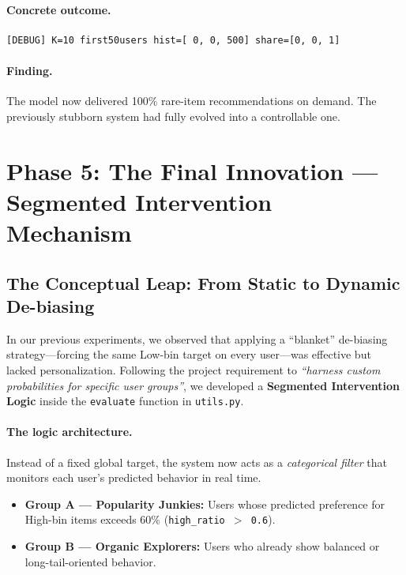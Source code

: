 \documentclass[11pt,a4paper]{article}
\begin{document}
\paragraph{Concrete outcome.}
\begin{lstlisting}[style=textout]
[DEBUG] K=10 first50users hist=[ 0, 0, 500] share=[0, 0, 1]
\end{lstlisting}

\paragraph{Finding.}
The model now delivered 100\% rare-item recommendations on demand. The previously stubborn system had fully evolved into a controllable one.

\section{Phase 5: The Final Innovation --- Segmented Intervention Mechanism}

\subsection{The Conceptual Leap: From Static to Dynamic De-biasing}
In our previous experiments, we observed that applying a ``blanket'' de-biasing strategy—forcing the same Low-bin target on every user—was effective but lacked personalization. Following the project requirement to \emph{``harness custom probabilities for specific user groups''}, we developed a \textbf{Segmented Intervention Logic} inside the \texttt{evaluate} function in \texttt{utils.py}.

\paragraph{The logic architecture.}
Instead of a fixed global target, the system now acts as a \emph{categorical filter} that monitors each user’s predicted behavior in real time.

\begin{itemize}[leftmargin=1.4em]
  \item \textbf{Group A --- Popularity Junkies:} Users whose predicted preference for High-bin items exceeds 60\% (\texttt{high\_ratio $>$ 0.6}).
  \item \textbf{Group B --- Organic Explorers:} Users who already show balanced or long-tail-oriented behavior.
\end{itemize}
\end{document}
